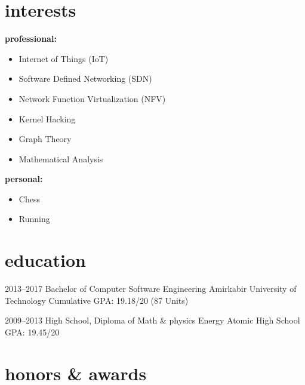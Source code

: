 \documentclass[]{friggeri-cv} %
\begin{document}
\section{interests}
\textbf{professional:}
\begin{itemize}
	\item Internet of Things (IoT)
	\item Software Defined Networking (SDN)
	\item Network Function Virtualization (NFV)
	\item Kernel Hacking
	\item Graph Theory
	\item Mathematical Analysis
\end{itemize}
\textbf{personal:}
\begin{itemize}	
	\item Chess
	\item Running
\end{itemize}



\section{education}

\begin{entrylist}


\entry
{2013--2017}
{Bachelor {\normalfont of Computer Software Engineering}}
{Amirkabir University of Technology}
{Cumulative GPA: 19.18/20 (87 Units)}


\entry
{2009--2013}
{High School, {\normalfont Diploma of Math \& physics}}
{Energy Atomic High School}
{GPA: 19.45/20}



\end{entrylist}


\section{honors \& awards}
\end{document}

